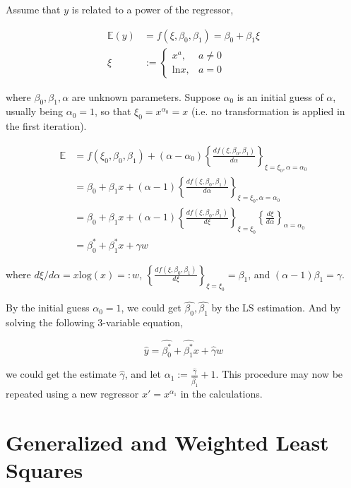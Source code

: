 \documentclass[12pt]{article}
\begin{document}
Assume that $y$ is related to a power of the regressor, 

$$
\begin{aligned}
\mathbb{E}(y) &= f(\xi, \beta_0, \beta_1) = \beta_0 + \beta_1 \xi \\[12pt]
\xi &:= \begin{cases} x^a, &a \neq 0 \\ \mathrm{ln}x, &a = 0 \end{cases}
\end{aligned}
$$

where $\beta_0, \beta_1, \alpha$ are unknown parameters. Suppose $\alpha_0$ is an initial guess of $\alpha$, usually being $\alpha_0 = 1$, so that $\xi_0 = x^{\alpha_0} = x$ (i.e. no transformation is applied in the first iteration). 

$$
\begin{aligned}
\mathbb{E} &= f(\xi_0, \beta_0, \beta_1) + (\alpha - \alpha_0) \left\{  \frac{d f(\xi, \beta_0, \beta_1)}{d \alpha} \right\}_{\xi=\xi_0, \alpha=\alpha_0} \\[10pt]
&= \beta_0 + \beta_1 x + (\alpha - 1) \left\{  \frac{d f(\xi, \beta_0, \beta_1)}{d \alpha} \right\}_{\xi=\xi_0, \alpha=\alpha_0} \\[10pt]
&= \beta_0 + \beta_1 x + (\alpha - 1) \left\{  \frac{d f(\xi, \beta_0, \beta_1)}{d \xi} \right\}_{\xi=\xi_0} \left\{  \frac{d \xi}{d \alpha} \right\}_{\alpha=\alpha_0} \\[12pt]
&= \beta_0^\ast + \beta_1^\ast x + \gamma w
\end{aligned}
$$

where $d\xi/d\alpha = x \mathrm{log}(x) =: w$, $\left\{  \frac{d f(\xi, \beta_0, \beta_1)}{d \xi} \right\}_{\xi=\xi_0} = \beta_1$, and $(\alpha -1 )\beta_1 = \gamma$.

By the initial guess $\alpha_0 =1$, we could get $\hat{\beta_0}, \hat{\beta_1}$ by the LS estimation. And by solving the following 3-variable equation,

$$
\hat{y} = \hat{\beta_0^\ast} + \hat{\beta_1^\ast}x + \hat{\gamma}w
$$

we could get the estimate $\hat{\gamma}$, and let $\alpha_1 := \frac{\hat{\gamma}}{\hat{\beta_1}} + 1$. This procedure
may now be repeated using a new regressor $x′ = x^{\alpha_1}$ in the calculations.


\section{Generalized and Weighted Least Squares}
\end{document}
